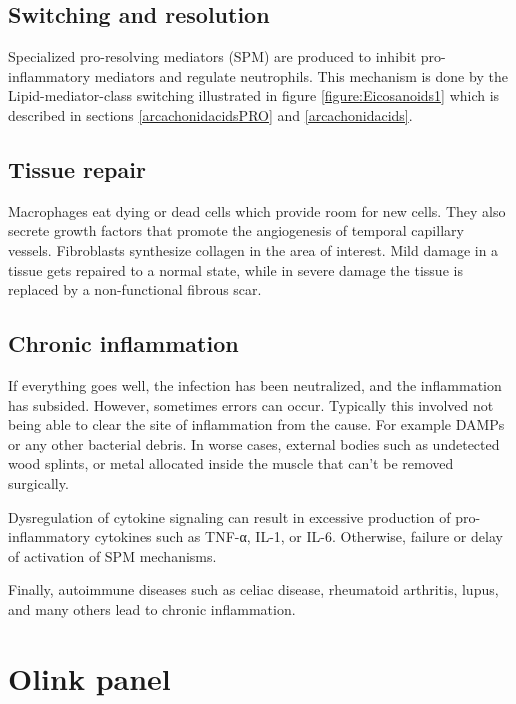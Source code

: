 \subsection{Switching and resolution}

Specialized pro-resolving mediators (SPM) are produced to inhibit pro-inflammatory mediators and regulate neutrophils. This mechanism is done by the Lipid-mediator-class switching illustrated in figure \ref{figure:Eicosanoids1} which is described in sections \ref{arcachonidacidsPRO} and \ref{arcachonidacids}.

\subsection{Tissue repair}

Macrophages eat dying or dead cells which provide room for new cells. They also secrete growth factors that promote the angiogenesis of temporal capillary vessels. Fibroblasts synthesize collagen in the area of interest. Mild damage in a tissue gets repaired to a normal state, while in severe damage the tissue is replaced by a non-functional fibrous scar.

\subsection{Chronic inflammation}

If everything goes well, the infection has been neutralized, and the inflammation has subsided. However, sometimes errors can occur. Typically this involved not being able to clear the site of inflammation from the cause. For example DAMPs or any other bacterial debris. In worse cases, external bodies such as undetected wood splints, or metal allocated inside the muscle that can't be removed surgically.

Dysregulation of cytokine signaling can result in excessive production of pro-inflammatory cytokines such as TNF-α, IL-1, or IL-6. Otherwise, failure or delay of activation of SPM mechanisms.

Finally, autoimmune diseases such as celiac disease, rheumatoid arthritis, lupus, and many others lead to chronic inflammation.


\section{Olink panel}
\label{ref:onlinkPanel}

